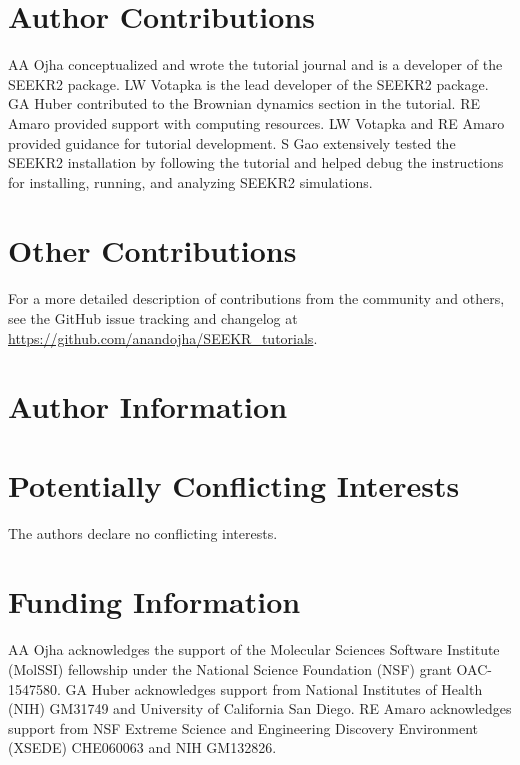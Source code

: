 \documentclass[9pt,training,pubversion]{livecoms}
\newcommand{\githubrepository}{\url{https://github.com/anandojha/SEEKR_tutorials}}
\begin{document}
\section*{Author Contributions}
\vspace{2mm}
AA Ojha conceptualized and wrote the tutorial journal and is a developer of the SEEKR2 package. LW Votapka is the lead developer of the SEEKR2 package. GA Huber contributed to the Brownian dynamics section in the tutorial. RE Amaro provided support with computing resources. LW Votapka and RE Amaro provided guidance for tutorial development. S Gao extensively tested the SEEKR2 installation by following the tutorial and helped debug the instructions for installing, running, and analyzing SEEKR2 simulations. 

\section*{Other Contributions}
For a more detailed description of contributions from the community and others, see the GitHub issue tracking and changelog at \githubrepository.

\section*{Author Information}
\makeorcid

\section*{Potentially Conflicting Interests}
\vspace{2mm}
The authors declare no conflicting interests. 

\section*{Funding Information}
\vspace{2mm}
AA Ojha acknowledges the support of the Molecular Sciences Software Institute (MolSSI) fellowship under the National Science Foundation (NSF) grant OAC-1547580. GA Huber acknowledges support from National Institutes of Health (NIH) GM31749 and University of California San Diego. RE Amaro acknowledges support from NSF Extreme Science and Engineering Discovery Environment (XSEDE) CHE060063 and NIH GM132826.



\end{document}
